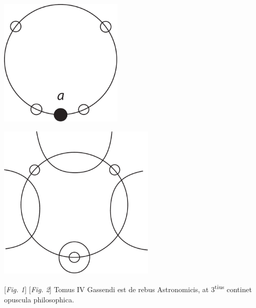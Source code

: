 \begin{minipage}[t]{0.5\textwidth}
\hspace*{5mm}
\includegraphics[width=0.44\textwidth]{images/LH035,14,02_110r-d1.pdf}
\end{minipage}
\hspace*{5mm}
\begin{minipage}[t]{0.5\textwidth}
\includegraphics[width=0.56\textwidth]{images/LH035,14,02_110r-d2.pdf}
\vspace{0.8em}
\end{minipage}
\hspace*{21mm} [\textit{Fig. 1}]\hspace*{59mm} [\textit{Fig. 2}] 
\pend
\newpage
\count{}
\count{}
\count{}
\pstart
[109v\textsuperscript{o}]
Tomus IV Gassendi\protect{}
est de rebus Astronomicis,
at 3\textsuperscript{tius} continet opuscula philosophica.
